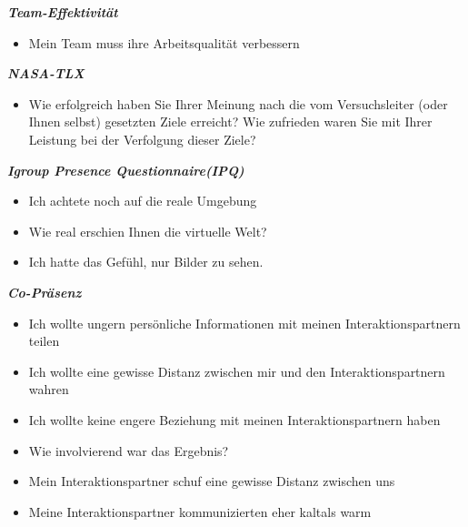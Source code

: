 \documentclass[a4paper,11pt]{article}%
\renewcommand{\\}{\vspace*{0.5\baselineskip} \newline}
\begin{document}
\textbf{\textit{Team-Effektivität}}
\begin{itemize}
	\item Mein Team muss ihre Arbeitsqualität verbessern
\end{itemize}

\textbf{\textit{NASA-TLX}}
\begin{itemize}
	\item Wie erfolgreich haben Sie Ihrer Meinung nach die vom Versuchsleiter (oder Ihnen selbst) gesetzten Ziele erreicht? Wie zufrieden waren Sie mit Ihrer Leistung bei der Verfolgung dieser Ziele? 
\end{itemize}

\textbf{\textit{Igroup Presence Questionnaire(IPQ)}}
\begin{itemize}
	\item Ich achtete noch auf die reale Umgebung
	\item Wie real erschien Ihnen die virtuelle Welt?
	\item Ich hatte das Gefühl, nur Bilder zu sehen. 
\end{itemize}

\textbf{\textit{Co-Präsenz}}
\begin{itemize}
	\item Ich wollte ungern persönliche Informationen mit meinen Interaktionspartnern teilen
	\item Ich wollte eine gewisse Distanz zwischen mir und den Interaktionspartnern wahren
	\item Ich wollte keine engere Beziehung mit meinen Interaktionspartnern haben
	\item Wie involvierend war das Ergebnis?
	\item Mein Interaktionspartner schuf eine gewisse Distanz zwischen uns
	\item Meine Interaktionspartner kommunizierten eher \flqq kalt\frqq als \flqq warm \frqq
\end{itemize}
\end{document}
